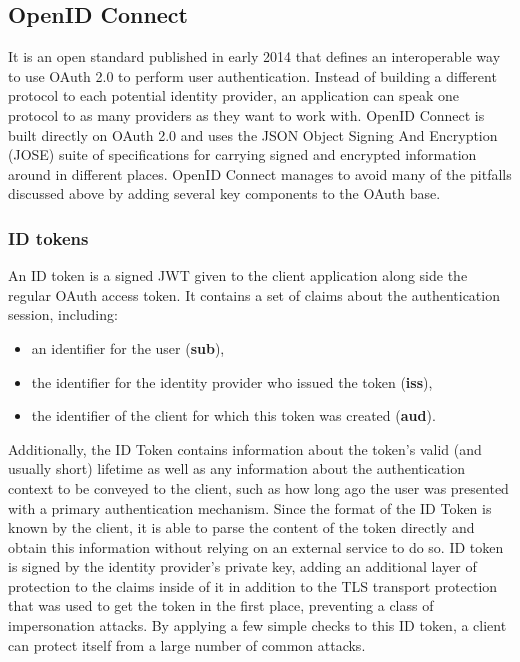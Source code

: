 \documentclass[a4paper, 10pt, titlepage]{article}
\begin{document}
\subsection{OpenID Connect}
It is an open standard published in early 2014 that defines an interoperable way to use OAuth 2.0 to perform user authentication.
Instead of building a different protocol to each potential identity provider, an application can speak one protocol to as many providers as they want to work with. 
OpenID Connect is built directly on OAuth 2.0 and uses the JSON Object Signing And Encryption (JOSE) suite of specifications for carrying signed and encrypted information around in different places.
OpenID Connect manages to avoid many of the pitfalls discussed above by adding several key components to the OAuth base.

\subsubsection{ID tokens}
An ID token is a signed JWT given to the client application along side the regular OAuth access token. It contains a set of claims about the authentication session, including:
\begin{itemize}
\item an identifier for the user (\textbf{sub}),
\item the identifier for the identity provider who issued the token (\textbf{iss}),
\item the identifier of the client for which this token was created (\textbf{aud}).
\end{itemize}
Additionally, the ID Token contains information about the token's valid (and usually short) lifetime as well as any information about the authentication context to be conveyed to the client, such as how long ago the user was presented with a primary authentication mechanism. Since the format of the ID Token is known by the client, it is able to parse the content of the token directly and obtain this information without relying on an external service to do so. ID token is signed by the identity provider's private key, adding an additional layer of protection to the claims inside of it in addition to the TLS transport protection that was used to get the token in the first place, preventing a class of impersonation attacks. By applying a few simple checks to this ID token, a client can protect itself from a large number of common attacks.
\end{document}
